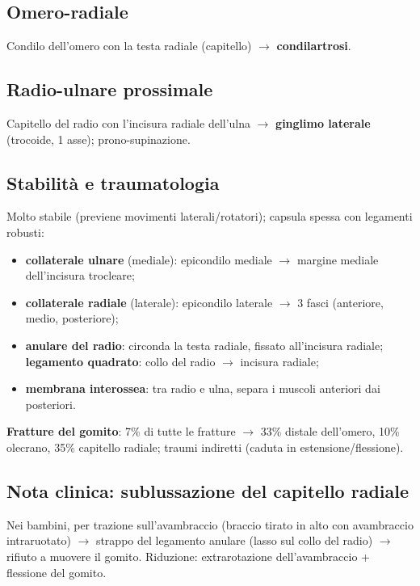 \subsection{Omero-radiale}
Condilo dell'omero con la testa radiale (capitello) $\rightarrow$ \textbf{condilartrosi}.

\subsection{Radio-ulnare prossimale}
Capitello del radio con l'incisura radiale dell'ulna $\rightarrow$ \textbf{ginglimo laterale}
(trocoide, 1 asse); prono-supinazione.

\subsection{Stabilità e traumatologia}
Molto stabile (previene movimenti laterali/rotatori); capsula spessa con legamenti robusti:
\begin{itemize}
  \item \textbf{collaterale ulnare} (mediale): epicondilo mediale $\rightarrow$ margine mediale
    dell'incisura trocleare;
  \item \textbf{collaterale radiale} (laterale): epicondilo laterale $\rightarrow$ 3 fasci (anteriore,
    medio, posteriore);
  \item \textbf{anulare del radio}: circonda la testa radiale, fissato all'incisura radiale;
    \textbf{legamento quadrato}: collo del radio $\rightarrow$ incisura radiale;
  \item \textbf{membrana interossea}: tra radio e ulna, separa i muscoli anteriori dai posteriori.
\end{itemize}
\textbf{Fratture del gomito}: 7\% di tutte le fratture $\rightarrow$ 33\% distale dell'omero, 10\%
olecrano, 35\% capitello radiale; traumi indiretti (caduta in estensione/flessione).

\subsection{Nota clinica: sublussazione del capitello radiale}
Nei bambini, per trazione sull'avambraccio (braccio tirato in alto con avambraccio intraruotato)
$\rightarrow$ strappo del legamento anulare (lasso sul collo del radio) $\rightarrow$ rifiuto a
muovere il gomito. Riduzione: extrarotazione dell'avambraccio + flessione del gomito.

